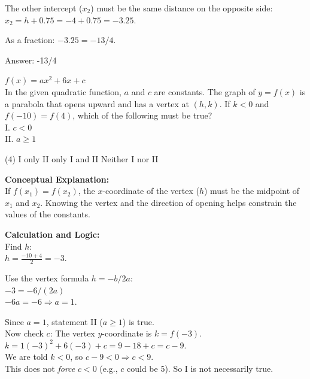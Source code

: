 \documentclass[11pt,paper=a4,answers]{exam}
\begin{document}
\begin{questions}
\begin{solution}
The other intercept ($x_2$) must be the same distance on the opposite side: \\
$x_2 = h + 0.75 = -4 + 0.75 = -3.25$.

\vspace{10pt}

As a fraction: $-3.25 = -13/4$.

\vspace{25pt}

Answer: \colorbox{yellow!100}{-13/4}
\end{solution}

\vspace{40pt}

\question
$f(x) = ax^2 + 6x + c$ \\
In the given quadratic function, $a$ and $c$ are constants. The graph of $y = f(x)$ is a parabola that opens upward and has a vertex at $(h, k)$. If $k < 0$ and $f(-10) = f(4)$, which of the following must be true? \\
I. $c < 0$ \\
II. $a \geq 1$
\begin{tasks}(4)
    \task I only
    \task II only
    \task I and II
    \task Neither I nor II
\end{tasks}

\begin{solution}
\textbf{Conceptual Explanation:} \\
If $f(x_1) = f(x_2)$, the $x$-coordinate of the vertex ($h$) must be the midpoint of $x_1$ and $x_2$. Knowing the vertex and the direction of opening helps constrain the values of the constants.

\vspace{20pt}

\textbf{Calculation and Logic:} \\
Find $h$: \\
$h = \frac{-10 + 4}{2} = -3$.

\vspace{10pt}

Use the vertex formula $h = -b/2a$: \\
$-3 = -6 / (2a)$ \\
$-6a = -6 \Rightarrow a = 1$.

\vspace{10pt}

Since $a=1$, statement II ($a \geq 1$) is true. \\
Now check $c$: The vertex $y$-coordinate is $k = f(-3)$. \\
$k = 1(-3)^2 + 6(-3) + c = 9 - 18 + c = c - 9$. \\
We are told $k < 0$, so $c - 9 < 0 \Rightarrow c < 9$. \\
This does not \textit{force} $c < 0$ (e.g., $c$ could be 5). So I is not necessarily true.


\end{solution}
\end{questions}
\end{document}
